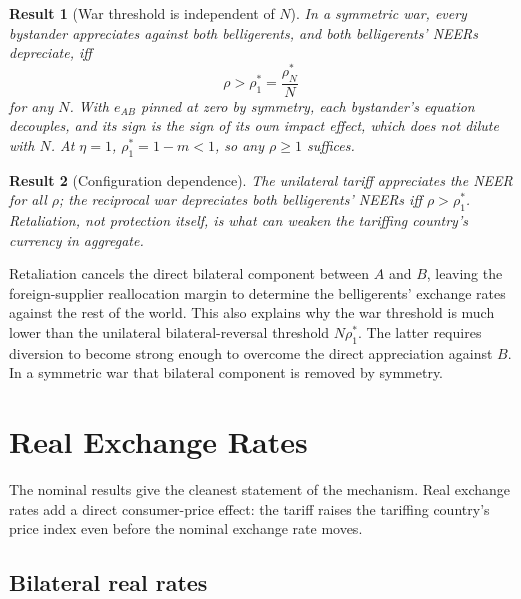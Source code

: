 \documentclass[11pt]{article}
\newtheorem{result}{Result}[section]
\begin{document}
\begin{result}[War threshold is independent of $N$]
In a symmetric war, every bystander appreciates against both belligerents, and both belligerents' NEERs depreciate, iff
\begin{equation}
\boxed{\;\rho > \rho_1^* = \frac{\rho_N^*}{N}\;}
\end{equation}
for any $N$. With $e_{AB}$ pinned at zero by symmetry, each bystander's equation decouples, and its sign is the sign of its own impact effect, which does not dilute with $N$. At $\eta = 1$, $\rho_1^* = 1 - m < 1$, so any $\rho \geq 1$ suffices.
\end{result}

\begin{result}[Configuration dependence]
The unilateral tariff appreciates the NEER for all $\rho$; the reciprocal war depreciates both belligerents' NEERs iff $\rho > \rho_1^*$. Retaliation, not protection itself, is what can weaken the tariffing country's currency in aggregate.
\end{result}

Retaliation cancels the direct bilateral component between $A$ and $B$, leaving the foreign-supplier reallocation margin to determine the belligerents' exchange rates against the rest of the world. This also explains why the war threshold is much lower than the unilateral bilateral-reversal threshold $N\rho_1^*$. The latter requires diversion to become strong enough to overcome the direct appreciation against $B$. In a symmetric war that bilateral component is removed by symmetry.

\section{Real Exchange Rates}

The nominal results give the cleanest statement of the mechanism. Real exchange rates add a direct consumer-price effect: the tariff raises the tariffing country's price index even before the nominal exchange rate moves.

\subsection{Bilateral real rates}
\end{document}
